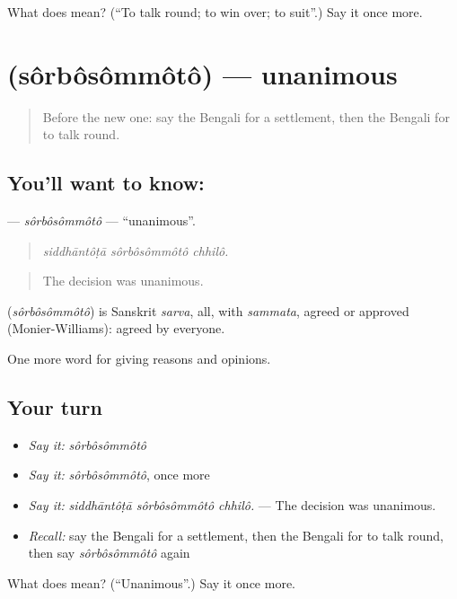 \begin{tcolorbox}[breakable,colback=teal!4,colframe=teal!35!black,title={Before you move on}]
What does  mean? (\textquotedblleft{}To talk round; to win over; to suit\textquotedblright{}.) Say it once more.
\end{tcolorbox}
\section[\texorpdfstring{\bn{সর্বসম্মত} (sôrbôsômmôtô)}{সর্বসম্মত (sôrbôsômmôtô)}]{ (sôrbôsômmôtô) — unanimous}

\label{lesson:BN-C365-sorbosommoto}



\begin{quote}
Before the new one: say the Bengali for a settlement, then the Bengali for to talk round.
\end{quote}

\subsection*{You'll want to know: }
\textbf{} — \emph{sôrbôsômmôtô} — \textquotedblleft{}unanimous\textquotedblright{}.

\begin{quote}
  
\end{quote}

\begin{quote}
\emph{siddhāntôṭā sôrbôsômmôtô chhilô.}
\end{quote}

\begin{quote}
The decision was unanimous.
\end{quote}

\begin{cousinweb}
\textbf{} (\emph{sôrbôsômmôtô}) is Sanskrit \emph{sarva}, all, with \emph{sammata}, agreed or approved (Monier-Williams): agreed by everyone.
\end{cousinweb}

\begin{grammarlens}[title={What you've built}]
One more word for giving reasons and opinions.
\end{grammarlens}

\subsection*{Your turn}
\begin{itemize}
\raggedright
  \item \emph{Say it:} \emph{sôrbôsômmôtô}
  \item \emph{Say it:} \emph{sôrbôsômmôtô}, once more
  \item \emph{Say it:} \emph{siddhāntôṭā sôrbôsômmôtô chhilô.} — The decision was unanimous.
  \item \emph{Recall:} say the Bengali for a settlement, then the Bengali for to talk round, then say \emph{sôrbôsômmôtô} again
\end{itemize}

\begin{tcolorbox}[breakable,colback=teal!4,colframe=teal!35!black,title={Before you move on}]
What does  mean? (\textquotedblleft{}Unanimous\textquotedblright{}.) Say it once more.
\end{tcolorbox}
